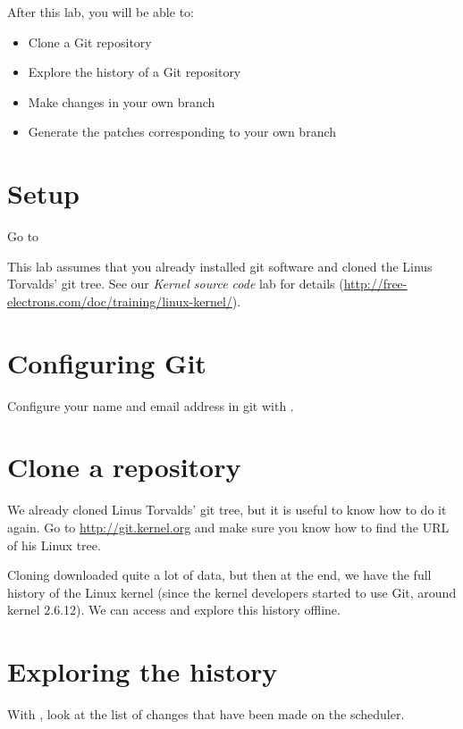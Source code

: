 
After this lab, you will be able to:

\begin{itemize}
\item Clone a Git repository
\item Explore the history of a Git repository
\item Make changes in your own branch
\item Generate the patches corresponding to your own branch
\end{itemize}

\section{Setup}

Go to 

This lab assumes that you already installed git software and cloned
the Linus Torvalds' git tree. See our {\em Kernel source code} lab for
details (\url{http://free-electrons.com/doc/training/linux-kernel/}).

\section{Configuring Git}

Configure your name and email address in git with .

\section{Clone a repository}

We already cloned Linus Torvalds' git tree, but it is useful to know
how to do it again. Go to \url{http://git.kernel.org} and make sure you know
how to find the  URL of his Linux tree.

Cloning downloaded quite a lot of data, but then at the end, we have
the full history of the Linux kernel (since the kernel developers
started to use Git, around kernel 2.6.12). We can access and explore
this history offline.

\section{Exploring the history}

With , look at the list of changes that have been made on the scheduler.

